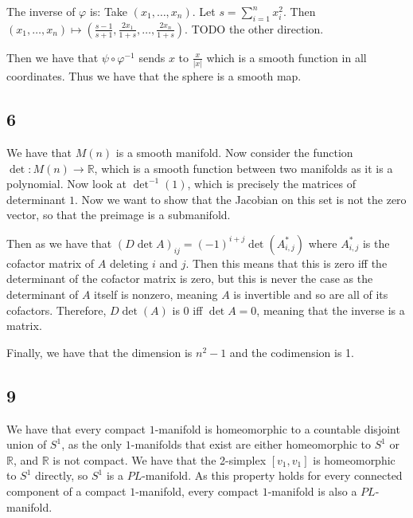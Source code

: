 \documentclass{article}
\theoremstyle{definition}
\numberwithin{theorem}{section}
\numberwithin{equation}{section}
\begin{document}
The inverse of $\varphi$ is: Take $(x_1, \ldots, x_n)$. Let $s = \sum_{i = 1}^n x_i^2$. Then $(x_1, \ldots, x_n) \mapsto (\frac{s - 1}{s + 1}, \frac{2x_1}{1 + s}, \ldots, \frac{2x_n}{1 + s})$. TODO the other direction. 

Then we have that $\psi \circ \varphi^{-1}$ sends $x$ to $ \frac{x}{|x|}$ which is a smooth function in all coordinates. Thus we have that the sphere is a smooth map. 

\subsection{6}
We have that $M(n)$ is a smooth manifold. Now consider the function $\det : M(n) \rightarrow \mathbb{R}$, which is a smooth function between two manifolds as it is a polynomial. Now look at $\det^{-1} (1)$, which is precisely the matrices of determinant $1$. Now we want to show that the Jacobian on this set is not the zero vector, so that the preimage is a submanifold. 

Then as we have that $(D \det A)_{ij} = (-1)^{i + j} \det(A^*_{i, j})$ where $A^*_{i, j}$ is the cofactor matrix of $A$ deleting $i$ and $j$. Then this means that this is zero iff the determinant of the cofactor matrix is zero, but this is never the case as the determinant of $A$ itself is nonzero, meaning $A$ is invertible and so are all of its cofactors. Therefore, $D \det(A)$ is 0 iff $\det A = 0$, meaning that the inverse is a matrix. 

Finally, we have that the dimension is $n^2-1$ and the codimension is 1. 

\subsection{9}
We have that every compact $1$-manifold is homeomorphic to a countable disjoint union of $S^1$, as the only $1$-manifolds that exist are either homeomorphic to $S^1$ or $\mathbb{R}$, and $\mathbb{R}$ is not compact. We have that the 2-simplex $[v_1, v_1]$ is homeomorphic to $S^1$ directly, so $S^1$ is a $PL$-manifold. As this property holds for every connected component of a compact $1$-manifold, every compact $1$-manifold is also a $PL$-manifold. 
\end{document}
